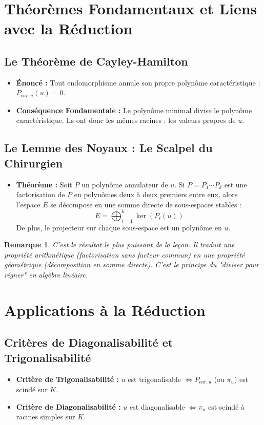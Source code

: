 \documentclass[12pt, a4paper, parskip=full]{report}
\theoremstyle{agregstyle}
\newtheorem{remark}[definition]{Remarque}
\begin{document}
\section{Théorèmes Fondamentaux et Liens avec la Réduction}

\subsection{Le Théorème de Cayley-Hamilton}
\begin{itemize}
    \item \textbf{Énoncé :} Tout endomorphisme annule son propre polynôme caractéristique : $P_{car,u}(u) = 0$.
    \item \textbf{Conséquence Fondamentale :} Le polynôme minimal divise le polynôme caractéristique. Ils ont donc les mêmes racines : les valeurs propres de $u$.
\end{itemize}

\subsection{Le Lemme des Noyaux : Le Scalpel du Chirurgien}
\begin{itemize}
    \item \textbf{Théorème :} Soit $P$ un polynôme annulateur de $u$. Si $P = P_1 \cdots P_k$ est une factorisation de $P$ en polynômes deux à deux premiers entre eux, alors l'espace $E$ se décompose en une somme directe de sous-espaces stables :
    $$ E = \bigoplus_{i=1}^k \ker(P_i(u)) $$
    De plus, le projecteur sur chaque sous-espace est un polynôme en $u$.
\end{itemize}
\begin{remark}
    C'est le résultat le plus puissant de la leçon. Il traduit une propriété arithmétique (factorisation sans facteur commun) en une propriété géométrique (décomposition en somme directe). C'est le principe du "diviser pour régner" en algèbre linéaire.
\end{remark}

\section{Applications à la Réduction}

\subsection{Critères de Diagonalisabilité et Trigonalisabilité}
\begin{itemize}
    \item \textbf{Critère de Trigonalisabilité :} $u$ est trigonalisable $\iff P_{car,u}$ (ou $\pi_u$) est scindé sur $K$.
    \item \textbf{Critère de Diagonalisabilité :} $u$ est diagonalisable $\iff \pi_u$ est scindé à racines simples sur $K$.
\end{itemize}
\end{document}
